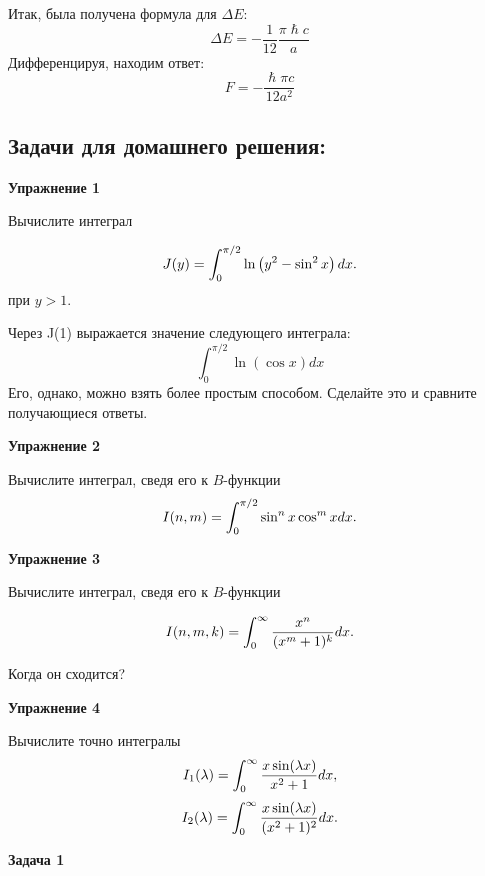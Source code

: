 \documentclass[a4paper,12pt]{article}
\begin{document}
\noindent
Итак, была получена формула для $\Delta E$:
$$
\Delta E=-\frac{1}{12}\frac{\pi\hslash c}{a}
$$
Дифференцируя, находим ответ:
$$
F=-\frac{\hslash\pi c}{12 a^2}
$$
\subsection*{Задачи для домашнего решения:}

\noindent \textbf{Упражнение 1}

\noindent Вычислите интеграл 

\begin{equation}
J(y)=\int_{0}^{\pi/2}\ln\left(y^2-\sin^2x\right)dx.\notag
\end{equation}
при $y>1$. 

\noindent
Через J(1) выражается значение следующего интеграла:
$$
\int_{0}^{\pi/2}\ln\left(\cos x\right) dx
$$
Его, однако, можно взять более простым способом. Сделайте это и сравните получающиеся ответы.

\vspace{15pt}
\noindent \textbf{Упражнение 2}

\noindent Вычислите интеграл, сведя его к $B$-функции
\begin{equation}
I(n,m)=\int_{0}^{\pi/2}\sin^{n}x\cos^{m}xdx.\notag
\end{equation}

\vspace{15pt}
\noindent \textbf{Упражнение 3}

\noindent Вычислите интеграл, сведя его к $B$-функции

\begin{equation}
I(n,m,k)	=\int_{0}^{\infty}\frac{x^{n}}{(x^{m}+1)^{k}}dx.\notag
\end{equation}

\noindent Когда он сходится?

\vspace{15pt}
\noindent \textbf{Упражнение 4}

\noindent Вычислите точно интегралы
\begin{equation}
I_{1}(\lambda)	=\int_{0}^{\infty}\frac{x\sin(\lambda x)}{x^{2}+1}dx,\notag
\end{equation}
\vspace{15pt}
\begin{equation}
I_{2}(\lambda)	=\int_{0}^{\infty}\frac{x\sin(\lambda x)}{(x^{2}+1)^{2}}dx.\notag
\end{equation}

\vspace{15pt}
\noindent \textbf{Задача 1}
\end{document}
